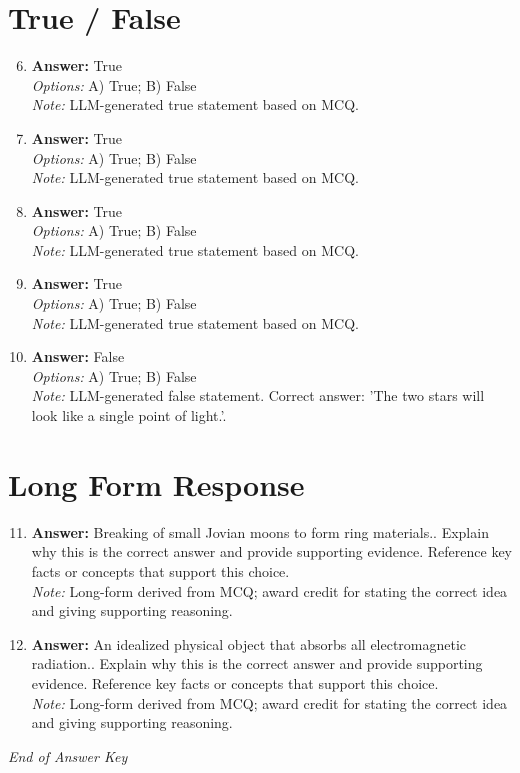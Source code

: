 \documentclass[12pt]{article}
\begin{document}
\section*{True / False}
\begin{enumerate}[label=\arabic*.]
\setcounter{enumi}{5}
\item \textbf{Answer:} True
\\ \textit{Options:} A) True; B) False
\\ \textit{Note:} LLM-generated true statement based on MCQ.
\item \textbf{Answer:} True
\\ \textit{Options:} A) True; B) False
\\ \textit{Note:} LLM-generated true statement based on MCQ.
\item \textbf{Answer:} True
\\ \textit{Options:} A) True; B) False
\\ \textit{Note:} LLM-generated true statement based on MCQ.
\item \textbf{Answer:} True
\\ \textit{Options:} A) True; B) False
\\ \textit{Note:} LLM-generated true statement based on MCQ.
\item \textbf{Answer:} False
\\ \textit{Options:} A) True; B) False
\\ \textit{Note:} LLM-generated false statement. Correct answer: 'The two stars will look like a single point of light.'.
\end{enumerate}

\section*{Long Form Response}
\begin{enumerate}[label=\arabic*.]
\setcounter{enumi}{10}
\item \textbf{Answer:} Breaking of small Jovian moons to form ring materials.. Explain why this is the correct answer and provide supporting evidence. Reference key facts or concepts that support this choice.
\\ \textit{Note:} Long-form derived from MCQ; award credit for stating the correct idea and giving supporting reasoning.
\item \textbf{Answer:} An idealized physical object that absorbs all electromagnetic radiation.. Explain why this is the correct answer and provide supporting evidence. Reference key facts or concepts that support this choice.
\\ \textit{Note:} Long-form derived from MCQ; award credit for stating the correct idea and giving supporting reasoning.
\end{enumerate}

\vfill
\noindent\textit{End of Answer Key}
\end{document}
